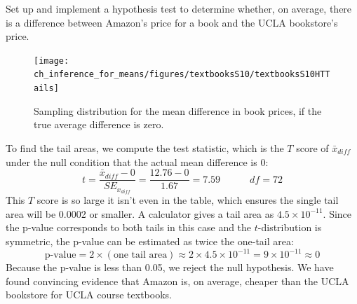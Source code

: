 \begin{example}{Set up and implement a hypothesis test to determine whether, on average, there is a difference between Amazon's price for a book and the UCLA bookstore's price.}
\begin{figure}
\centering
\texttt{[image: ch\_inference\_for\_means/figures/textbooksS10/textbooksS10HTTails]}
\caption{Sampling distribution for the mean difference in book prices, if the true average difference is zero.}
\label{textbooksS10HTTails}
\end{figure}

To find the tail areas, we compute the test statistic, which is the $T$ score of $\bar{x}_{diff}$ under the null condition that the actual mean difference is 0:
$$t = \frac{\bar{x}_{diff} - 0}{SE_{x_{diff}}} = \frac{12.76 - 0}{1.67} = 7.59  \quad \quad \quad df=72$$
This $T$ score is so large it isn't even in the table, which ensures the single tail area will be 0.0002 or smaller. A calculator gives a tail area as $4.5\times 10^{-11}$. Since the p-value corresponds to both tails in this case and the $t$-distribution is symmetric, the p-value can be estimated as twice the one-tail area:
$$\text{p-value} = 2\times (\text{one tail area}) \approx 2\times 4.5\times 10^{-11} = 9\times 10^{-11}\approx 0$$
Because the p-value is less than 0.05, we reject the null hypothesis. We have found convincing evidence that Amazon is, on average, cheaper than the UCLA bookstore for UCLA course textbooks.
\end{example}

